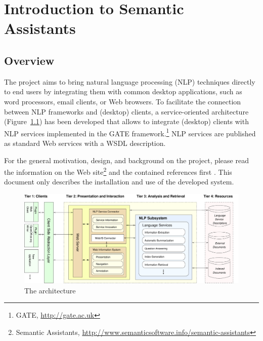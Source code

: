 
\chapter{Introduction to Semantic Assistants}

\section{Overview}
The \sa project aims to bring natural language processing (NLP)
techniques directly to end users by integrating them with common
desktop applications, such as word processors, email clients, or Web
browsers. To facilitate the connection between NLP frameworks and
(desktop) clients, a service-oriented architecture
(Figure~\ref{fig:arch}) has been developed that allows to integrate
(desktop) clients with NLP services implemented in the GATE
framework.\footnote{GATE, \url{http://gate.ac.uk}} NLP services are
published as standard Web services with a WSDL description.

For the general motivation, design, and background on the \sa project,
please read the information on the \sa Web site\footnote{Semantic
  Assistants,
  \url{http://www.semanticsoftware.info/semantic-assistants}} and the
contained references first \citep{giwi08,aswc08}. This document only
describes the installation and use of the developed system.

\begin{figure}[t]
  \centering
  \includegraphics[width=\textwidth]{pictures/arch}
  \caption{The \sa architecture}
  \label{fig:arch}
\end{figure}


